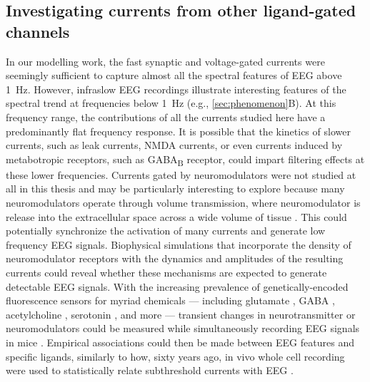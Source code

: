 \subsection{Investigating currents from other ligand-gated channels}
In our modelling work, the fast synaptic and voltage-gated currents were seemingly sufficient to capture almost all the spectral features of EEG above \qty{1}{\hertz}. However, infraslow EEG recordings illustrate interesting features of the spectral trend at frequencies below \qty{1}{\hertz} (e.g., \autoref{sec:phenomenon}B). At this frequency range, the contributions of all the currents studied here have a predominantly flat frequency response. It is possible that the kinetics of slower currents, such as leak currents, NMDA currents, or even currents induced by metabotropic receptors, such as GABA\textsubscript{B} receptor, could impart filtering effects at these lower frequencies. Currents gated by neuromodulators were not studied at all in this thesis and may be particularly interesting to explore because many neuromodulators operate through volume transmission, where neuromodulator is release into the extracellular space across a wide volume of tissue \cite{Ozcete2024}. This could potentially synchronize the activation of many currents and generate low frequency EEG signals. Biophysical simulations that incorporate the density of neuromodulator receptors with the dynamics and amplitudes of the resulting currents could reveal whether these mechanisms are expected to generate detectable EEG signals. With the increasing prevalence of genetically-encoded fluorescence sensors for myriad chemicals --- including glutamate \cite{Marvin2013}, GABA \cite{Marvin2019}, acetylcholine \cite{Jing2018}, serotonin \cite{Wan2021}, and more --- transient changes in neurotransmitter or neuromodulators could be measured while simultaneously recording EEG signals in mice \cite{Kim2024,Teng2023}. Empirical associations could then be made between EEG features and specific ligands, similarly to how, sixty years ago, in vivo whole cell recording were used to statistically relate subthreshold currents with EEG \cite{KLEE1965}.

